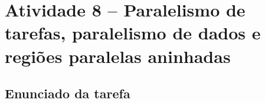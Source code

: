 %
%
%

\chapter{Atividade 8 -- Paralelismo de tarefas, paralelismo de dados e regiões paralelas aninhadas}

\label{chap:atvd08}

\section{Enunciado da tarefa}
\label{sec:atvd08-enunciado}

